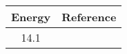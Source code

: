 \centering
\begin{tabular}{c c}
    \toprule
    \bf{Energy} & \bf{Reference} \\
    \midrule
    14.1 & \cite{Meier1969}\\
    \bottomrule
\end{tabular}
